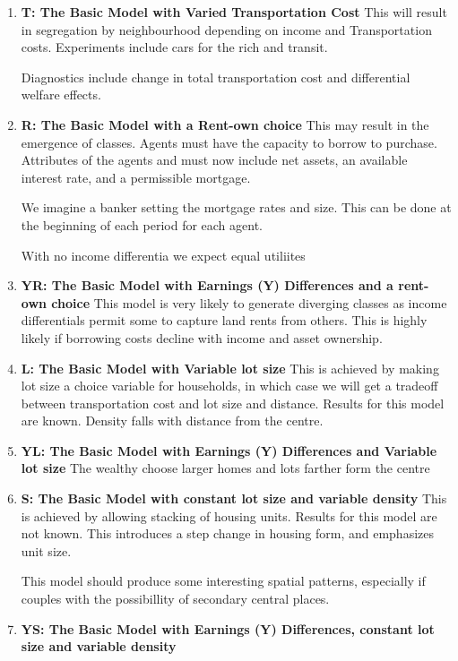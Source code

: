 \documentclass[preview, 12pt]{standalone}
\begin{document}
\begin{enumerate}
\item \textbf{T: The Basic Model with Varied Transportation Cost }
This will result in segregation by neighbourhood depending on income and Transportation costs. Experiments include cars for the rich and  transit. 

Diagnostics include change in total transportation cost and differential welfare effects.


\item \textbf{R: The Basic Model with a Rent-own choice}
This may result in the emergence of classes. Agents must have the capacity to borrow to purchase. Attributes of the agents and must now include  net assets,  an available interest rate, and a permissible mortgage.

We imagine a banker setting the mortgage rates and size. This can be done at the beginning of each period for each agent. 

With no income differentia we expect equal utiliites

\item \textbf{YR: The Basic Model with Earnings (Y) Differences and a rent-own choice}
This model is very likely to generate diverging classes as income differentials permit some to capture land rents from others. This is highly likely if borrowing costs decline with income and asset ownership.

\item \textbf{L: The Basic Model with Variable lot size}
This is achieved by making lot size a choice variable for households, in which case we will get a tradeoff between transportation cost and lot size and distance. Results for this model are known. Density  falls with distance from the centre. 

\item \textbf{YL: The Basic Model with Earnings (Y) Differences and Variable lot size}
The wealthy choose larger homes and lots farther form the centre

\item \textbf{S: The Basic Model with constant lot size and variable density}
This is achieved by allowing stacking of housing units. Results for this model are not known. This introduces a step change in housing form, and emphasizes unit size.

This model should produce some interesting spatial patterns, especially if couples with the possibillity of secondary central places.

\item \textbf{YS: The Basic Model with Earnings (Y) Differences, constant lot size and variable density}


\end{enumerate}
\end{document}
